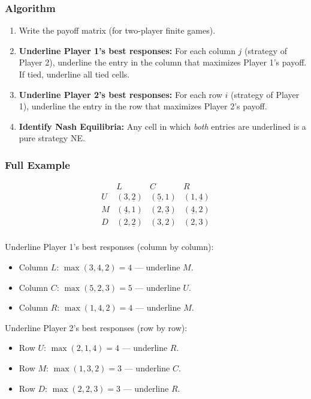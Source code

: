 \documentclass[hidelinks]{article}
\begin{document}
\subsubsection{Algorithm}

\begin{enumerate}
    \item Write the payoff matrix (for two-player finite games).
    \item \textbf{Underline Player 1's best responses:} For each column $j$ (strategy of Player 2), underline the entry in the column that maximizes Player 1's payoff. If tied, underline all tied cells.
    \item \textbf{Underline Player 2's best responses:} For each row $i$ (strategy of Player 1), underline the entry in the row that maximizes Player 2's payoff.
    \item \textbf{Identify Nash Equilibria:} Any cell in which \textit{both} entries are underlined is a pure strategy NE.
\end{enumerate}

\subsubsection{Full Example}

\[
\begin{array}{c|ccc}
 & L & C & R \\
\hline
U & (3,\underline{2}) & (\underline{5},1) & (1,\underline{4}) \\
M & (\underline{4},1) & (2,\underline{3}) & (\underline{4},2) \\
D & (2,\underline{2}) & (3,2) & (2,3) \\
\end{array}
\]

Underline Player 1's best responses (column by column):
\begin{itemize}
    \item Column $L$: $\max(3,4,2) = 4$ — underline $M$.
    \item Column $C$: $\max(5,2,3) = 5$ — underline $U$.
    \item Column $R$: $\max(1,4,2) = 4$ — underline $M$.
\end{itemize}

Underline Player 2's best responses (row by row):
\begin{itemize}
    \item Row $U$: $\max(2,1,4) = 4$ — underline $R$.
    \item Row $M$: $\max(1,3,2) = 3$ — underline $C$.
    \item Row $D$: $\max(2,2,3) = 3$ — underline $R$.
\end{itemize}
\end{document}

